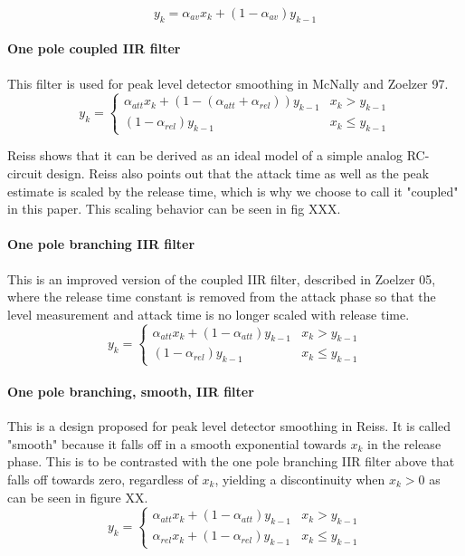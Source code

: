 \documentclass[../main2.tex]{subfiles}
\begin{document}
\begin{equation}
y_k = \alpha_{av}x_k + (1-\alpha_{av}) y_{k-1}
\end{equation}

\paragraph{One pole coupled IIR filter}
This filter is used for peak level detector smoothing in McNally and Zoelzer 97.
\begin{equation}
y_k = \begin{cases}
    \alpha_{att} x_k + (1- (\alpha_{att} + \alpha_{rel})) y_{k-1}  	& x_k > y_{k-1} \\
    (1-\alpha_{rel}) y_{k-1} 								& x_k \leq y_{k-1}
\end{cases}
\end{equation}

Reiss shows that it can be derived as an ideal model of a simple analog RC-circuit design. Reiss also points out that the attack time as well as the peak estimate is scaled by the release time, which is why we choose to call it "coupled" in this paper. This scaling behavior can be seen in fig XXX.

\paragraph{One pole branching IIR filter}
This is an improved version of the coupled IIR filter, described in Zoelzer 05, where the release time constant is removed from the attack phase so that the level measurement and attack time is no longer scaled with release time.
\begin{equation}
y_k = \begin{cases}
    \alpha_{att} x_k + (1-\alpha_{att}) y_{k-1} 	& x_k > y_{k-1} \\
    (1-\alpha_{rel}) y_{k-1} 					& x_k \leq y_{k-1}
\end{cases}
\end{equation}

\paragraph{One pole branching, smooth, IIR filter}
This is a design proposed for peak level detector smoothing in Reiss. It is called "smooth" because it falls off in a smooth exponential towards $x_k$ in the release phase. This is to be contrasted with the one pole branching IIR filter above that falls off towards zero, regardless of $x_k$, yielding a discontinuity when $x_k > 0$ as can be seen in figure XX.
\begin{equation}
y_k = \begin{cases}
    \alpha_{att} x_k + (1-\alpha_{att}) y_{k-1} 	& x_k > y_{k-1} \\
    \alpha_{rel} x_k + (1-\alpha_{rel}) y_{k-1} 	& x_k \leq y_{k-1}
\end{cases}
\end{equation}
\end{document}
